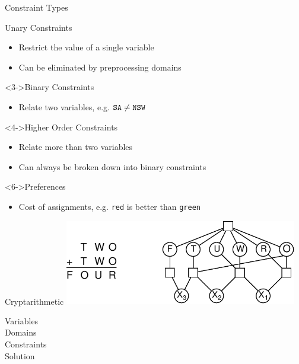 \documentclass[12pt]{beamer}
\newcommand{\V}[1]{\mbox{\texttt{#1}}}
\begin{document}
\begin{frame}{Constraint Types}
	\begin{block}{Unary Constraints}
		\begin{itemize}
			\item Restrict the value of a single variable
			\item<2-> Can be eliminated by preprocessing domains
		\end{itemize}
	\end{block}
	\begin{block}<3->{Binary Constraints}
		\begin{itemize}
			\item Relate two variables, e.g. $\V{SA} \neq \V{NSW}$
		\end{itemize}
	\end{block}
	\pause
	\begin{block}<4->{Higher Order Constraints}
		\begin{itemize}
			\item Relate more than two variables
			\item<5-> Can always be broken down into binary constraints
		\end{itemize}
	\end{block}
	\begin{block}<6->{Preferences}
		\begin{itemize}
			\item Cost of assignments, e.g. \V{red} is better than \V{green}
		\end{itemize}
	\end{block}
\end{frame}
\begin{frame}{Cryptarithmetic}
	\includegraphics[width=4in]{cryptarithmetic.pdf}
	\begin{description}
		\item[Variables] 
		\item[Domains] 
		\item[Constraints] 
		\item[Solution] 
	\end{description}
\end{frame}
\end{document}
